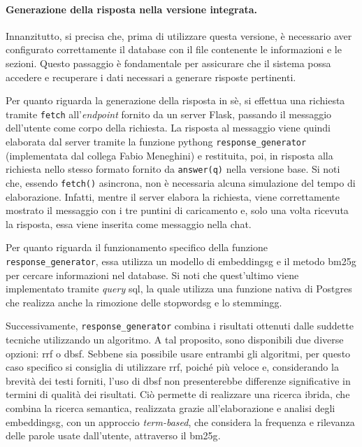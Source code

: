 \paragraph{Generazione della risposta nella versione integrata.} Innanzitutto, si precisa che, prima di utilizzare questa versione, è necessario aver configurato correttamente il database con il file contenente le informazioni e 
le sezioni. Questo passaggio è fondamentale per assicurare che il sistema possa accedere e recuperare i dati necessari a generare risposte pertinenti.

Per quanto riguarda la generazione della risposta in sè, si effettua una richiesta tramite \texttt{fetch} all'\emph{endpoint} fornito da un server Flask, passando il messaggio dell'utente come corpo della richiesta. 
La risposta al messaggio viene quindi elaborata dal server tramite la funzione \gls{pythong} \texttt{response\_generator} (implementata dal collega Fabio Meneghini) e restituita, poi, in risposta alla richiesta 
nello stesso formato fornito da \texttt{answer(q)} nella versione base.
Si noti che, essendo \texttt{fetch()} asincrona, non è necessaria alcuna simulazione del tempo di elaborazione. Infatti, mentre il server elabora la richiesta, viene correttamente 
mostrato il messaggio con i tre puntini di caricamento e, solo una volta ricevuta la risposta, essa viene inserita come messaggio nella chat.

Per quanto riguarda il funzionamento specifico della funzione \texttt{response\_generator}, essa utilizza un modello di \gls{embeddingsg} e il metodo \gls{bm25g} per cercare informazioni 
nel database. 
Si noti che quest'ultimo viene implementato tramite \emph{query} \gls{sql}, la quale utilizza una funzione nativa di Postgres che realizza anche la rimozione delle \gls{stopwordsg} e lo \gls{stemmingg}.

Successivamente, \texttt{response\_generator} combina i risultati ottenuti dalle suddette tecniche utilizzando un algoritmo. A tal proposito, sono disponibili due diverse opzioni: \gls{rrf} o \gls{dbsf}.
Sebbene sia possibile usare entrambi gli algoritmi, per questo caso specifico si consiglia di utilizzare \gls{rrf}, poiché più veloce e, considerando la brevità dei testi forniti, 
l'uso di \gls{dbsf} non presenterebbe differenze significative in termini di qualità dei risultati.
Ciò permette di realizzare una ricerca ibrida, che combina la ricerca semantica, realizzata grazie all'elaborazione e analisi degli \gls{embeddingsg}, con un approccio \emph{term-based}, che considera la frequenza e 
rilevanza delle parole usate dall'utente, attraverso il \gls{bm25g}.   


